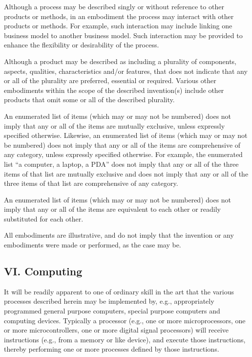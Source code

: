 \documentclass[11pt,a4paper]{article}
\begin{document}
Although a process may be described singly or without reference to other products or methods, in an embodiment the process may interact with other products or methods. For example, such interaction may include linking one business model to another business model. Such interaction may be provided to enhance the flexibility or desirability of the process.

Although a product may be described as including a plurality of components, aspects, qualities, characteristics and/or features, that does not indicate that any or all of the plurality are preferred, essential or required. Various other embodiments within the scope of the described invention(s) include other products that omit some or all of the described plurality.

An enumerated list of items (which may or may not be numbered) does not imply that any or all of the items are mutually exclusive, unless expressly specified otherwise. Likewise, an enumerated list of items (which may or may not be numbered) does not imply that any or all of the items are comprehensive of any category, unless expressly specified otherwise. For example, the enumerated list “a computer, a laptop, a PDA” does not imply that any or all of the three items of that list are mutually exclusive and does not imply that any or all of the three items of that list are comprehensive of any category.

An enumerated list of items (which may or may not be numbered) does not imply that any or all of the items are equivalent to each other or readily substituted for each other.

All embodiments are illustrative, and do not imply that the invention or any embodiments were made or performed, as the case may be.

\subsection{VI. Computing}

It will be readily apparent to one of ordinary skill in the art that the various processes described herein may be implemented by, e.g., appropriately programmed general purpose computers, special purpose computers and computing devices. Typically a processor (e.g., one or more microprocessors, one or more microcontrollers, one or more digital signal processors) will receive instructions (e.g., from a memory or like device), and execute those instructions, thereby performing one or more processes defined by those instructions.
\end{document}
